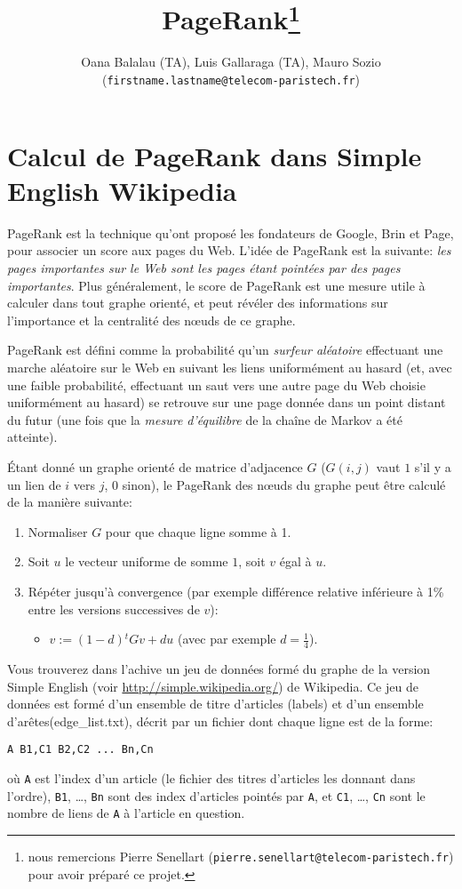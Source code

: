\documentclass[pdftex,a4paper,DIV15]{scrartcl}
\title{
PageRank\footnote{nous remercions Pierre Senellart (\texttt{pierre.senellart@telecom-paristech.fr}) pour avoir préparé ce projet. } }
\author{Oana Balalau (TA), Luis Gallaraga (TA), Mauro Sozio \\
(\texttt{firstname.lastname@telecom-paristech.fr})}
\begin{document}
\maketitle



\section*{Calcul de PageRank dans Simple English
Wikipedia}

PageRank est la technique qu'ont proposé les fondateurs de Google, Brin
et Page, pour associer un score aux pages du Web. L'idée de PageRank est
la suivante: \emph{les pages importantes sur le Web sont les pages étant
pointées par des pages importantes}. Plus généralement, le score de
PageRank est une mesure utile à calculer dans tout graphe orienté, et
peut révéler des informations sur l'importance et la centralité des
n\oe{}uds de ce graphe.

PageRank est défini comme la probabilité qu'un \emph{surfeur aléatoire}
effectuant une marche aléatoire sur le Web en suivant les liens
uniformément au hasard (et, avec une faible
probabilité, effectuant un saut vers une autre page du Web choisie
uniformément au hasard) se retrouve sur une page donnée dans un point
distant du futur (une fois que la \emph{mesure d'équilibre} de la chaîne
de Markov a été atteinte).

Étant donné un graphe orienté de matrice d'adjacence $G$ ($G(i,j)$ vaut
$1$ s'il y a un lien de $i$ vers $j$, $0$ sinon), le PageRank des
n\oe{}uds du graphe peut être calculé de la manière suivante:
\begin{enumerate}
  \item Normaliser $G$ pour que chaque ligne somme à 1.
  \item Soit $u$ le vecteur uniforme de somme $1$, soit $v$ égal à $u$.
  \item Répéter jusqu'à convergence (par exemple différence relative
    inférieure à 1\% entre les versions successives de $v$):
    \begin{itemize}
      \item $v:=(1-d){}^tGv + du$ (avec par exemple $d=\tfrac 1 4$).
    \end{itemize}
\end{enumerate}

Vous trouverez dans l'achive un jeu de données formé du graphe
de la version Simple English (voir \url{http://simple.wikipedia.org/}) de
Wikipedia. Ce jeu de données est formé d'un ensemble de titre d'articles
(labels) et d'un ensemble d'arêtes(edge\_list.txt), décrit par un fichier dont 
chaque ligne est de la forme:
\begin{verbatim}
A B1,C1 B2,C2 ... Bn,Cn
\end{verbatim}
où \verb|A| est l'index d'un article (le fichier des titres d'articles
les donnant dans l'ordre), \verb|B1|, \dots, \verb|Bn| sont des index
d'articles pointés par \verb|A|, et \verb|C1|, \dots, \verb|Cn| sont le
nombre de liens de
\verb|A| à l'article en question.
\end{document}
